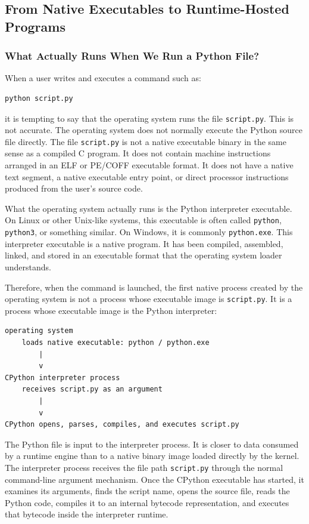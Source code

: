 \subsection{From Native Executables to Runtime-Hosted Programs}


\subsubsection{What Actually Runs When We Run a Python File?}

When a user writes and executes a command such as:

\begin{verbatim}
python script.py
\end{verbatim}

it is tempting to say that the operating system runs the file \texttt{script.py}. This is not accurate. The operating system does not normally execute the Python source file directly. The file \texttt{script.py} is not a native executable binary in the same sense as a compiled C program. It does not contain machine instructions arranged in an ELF or PE/COFF executable format. It does not have a native text segment, a native executable entry point, or direct processor instructions produced from the user's source code.

What the operating system actually runs is the Python interpreter executable. On Linux or other Unix-like systems, this executable is often called \texttt{python}, \texttt{python3}, or something similar. On Windows, it is commonly \texttt{python.exe}. This interpreter executable is a native program. It has been compiled, assembled, linked, and stored in an executable format that the operating system loader understands.

Therefore, when the command is launched, the first native process created by the operating system is not a process whose executable image is \texttt{script.py}. It is a process whose executable image is the Python interpreter:

\begin{verbatim}
operating system
    loads native executable: python / python.exe
        |
        v
CPython interpreter process
    receives script.py as an argument
        |
        v
CPython opens, parses, compiles, and executes script.py
\end{verbatim}

The Python file is input to the interpreter process. It is closer to data consumed by a runtime engine than to a native binary image loaded directly by the kernel. The interpreter process receives the file path \texttt{script.py} through the normal command-line argument mechanism. Once the CPython executable has started, it examines its arguments, finds the script name, opens the source file, reads the Python code, compiles it to an internal bytecode representation, and executes that bytecode inside the interpreter runtime.

